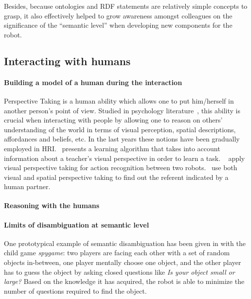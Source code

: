 \documentclass[preprint,3p,times]{elsarticle}
\begin{document}
Besides, because ontologies and RDF statements are relatively simple concepts
to grasp, it also effectively helped to grow awareness amongst colleagues on
the significance of the ``semantic level'' when developing new components for
the robot.

\subsection{Interacting with humans}

\paragraph{Building a model of a human during the interaction} Perspective
Taking is a human ability which allows one to put him/herself in another
person's point of view. Studied in psychology
literature~\cite{Flavell1992,Tversky1999}, this ability is crucial when
interacting with people by allowing one to reason on others' understanding of
the world in terms of visual perception, spatial descriptions, affordances and
beliefs, etc.  In the last years these notions have been gradually
employed in HRI.~\cite{Breazeal2006} presents a learning
algorithm that takes into account information about a teacher's visual
perspective in order to learn a task. ~\cite{Johnson2005} apply visual
perspective taking for action recognition between two
robots.~\cite{Trafton2005} use both visual and spatial perspective taking to
find out the referent indicated by a human partner.


\paragraph{Reasoning with the humans}


\paragraph{Limits of disambiguation at semantic level}


One prototypical example of semantic disambiguation has been given in
\cite{Ros2010b} with the child game \emph{spygame}: two players are facing
each other with a set of random objects in-between, one player mentally choose
one object, and the other player has to guess the object by asking closed
questions like \emph{Is your object small or large?} Based on the knowledge it
has acquired, the robot is able to minimize the number of questions required to
find the object.
\end{document}
